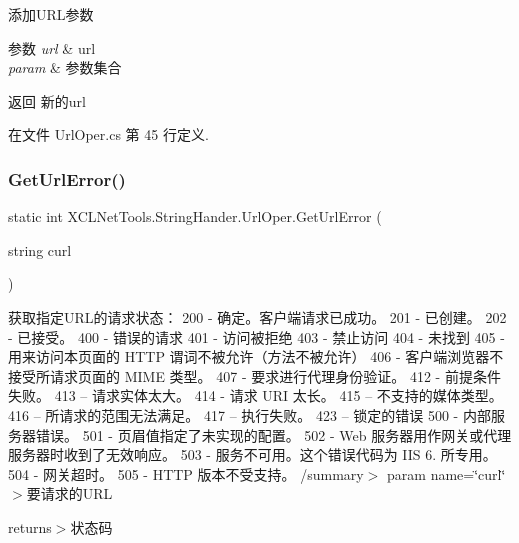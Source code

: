 添加\+U\+R\+L参数 


\begin{DoxyParams}{参数}
{\em url} & url\\
\hline
{\em param} & 参数集合\\
\hline
\end{DoxyParams}
\begin{DoxyReturn}{返回}
新的url
\end{DoxyReturn}


在文件 Url\+Oper.\+cs 第 45 行定义.

\mbox{\label{class_x_c_l_net_tools_1_1_string_hander_1_1_url_oper_ac5c640bfc662741345164efa1efbc525}} 
\subsubsection{\texorpdfstring{Get\+Url\+Error()}{GetUrlError()}}
{\footnotesize\ttfamily static int X\+C\+L\+Net\+Tools.\+String\+Hander.\+Url\+Oper.\+Get\+Url\+Error (\begin{DoxyParamCaption}\item[{string}]{curl }\end{DoxyParamCaption})\hspace{0.3cm}{\ttfamily [static]}}



获取指定\+U\+R\+L的请求状态： 200 -\/ 确定。客户端请求已成功。 201 -\/ 已创建。 202 -\/ 已接受。 400 -\/ 错误的请求 401 -\/ 访问被拒绝 403 -\/ 禁止访问 404 -\/ 未找到 405 -\/ 用来访问本页面的 H\+T\+TP 谓词不被允许（方法不被允许） 406 -\/ 客户端浏览器不接受所请求页面的 M\+I\+ME 类型。 407 -\/ 要求进行代理身份验证。 412 -\/ 前提条件失败。 413 – 请求实体太大。 414 -\/ 请求 U\+RI 太长。 415 – 不支持的媒体类型。 416 – 所请求的范围无法满足。 417 – 执行失败。 423 – 锁定的错误 500 -\/ 内部服务器错误。 501 -\/ 页眉值指定了未实现的配置。 502 -\/ Web 服务器用作网关或代理服务器时收到了无效响应。 503 -\/ 服务不可用。这个错误代码为 I\+IS 6. 所专用。 504 -\/ 网关超时。 505 -\/ H\+T\+TP 版本不受支持。 /summary$>$ param name=\char`\"{}curl\char`\"{}$>$要请求的\+U\+RL

returns$>$状态码



